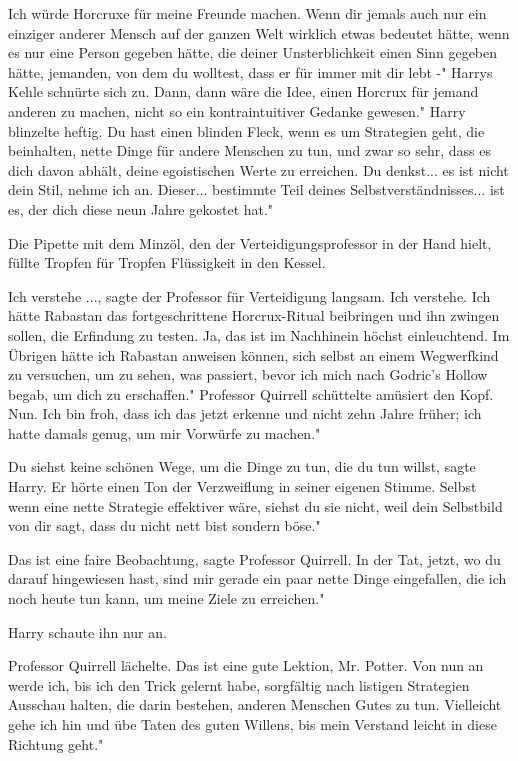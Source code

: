 \glqq Ich würde Horcruxe für meine Freunde machen. Wenn dir jemals auch nur ein
einziger anderer Mensch auf der ganzen Welt wirklich etwas bedeutet hätte, wenn
es nur eine Person gegeben hätte, die deiner Unsterblichkeit einen Sinn gegeben
hätte, jemanden, von dem du wolltest, dass er für immer mit dir lebt -" Harrys
Kehle schnürte sich zu. \glqq Dann, dann wäre die Idee, einen Horcrux für jemand
anderen zu machen, nicht so ein kontraintuitiver Gedanke gewesen." Harry
blinzelte heftig. \glqq Du hast einen blinden Fleck, wenn es um Strategien geht,
die beinhalten, nette Dinge für andere Menschen zu tun, und zwar so sehr, dass
es dich davon abhält, deine egoistischen Werte zu erreichen. Du denkst... es ist
nicht dein Stil, nehme ich an. Dieser... bestimmte Teil deines
Selbstverständnisses... ist es, der dich diese neun Jahre gekostet hat."

Die Pipette mit dem Minzöl, den der Verteidigungsprofessor in der Hand hielt,
füllte Tropfen für Tropfen Flüssigkeit in den Kessel.

\glqq Ich verstehe ...\grqq{}, sagte der Professor für Verteidigung langsam.
\glqq Ich verstehe. Ich hätte Rabastan das fortgeschrittene Horcrux-Ritual
beibringen und ihn zwingen sollen, die Erfindung zu testen. Ja, das ist im
Nachhinein höchst einleuchtend. Im Übrigen hätte ich Rabastan anweisen können,
sich selbst an einem Wegwerfkind zu versuchen, um zu sehen, was passiert, bevor
ich mich nach Godric's Hollow begab, um dich zu erschaffen." Professor Quirrell
schüttelte amüsiert den Kopf. \glqq Nun. Ich bin froh, dass ich das jetzt
erkenne und nicht zehn Jahre früher; ich hatte damals genug, um mir Vorwürfe zu
machen."

\glqq Du siehst keine schönen Wege, um die Dinge zu tun, die du tun
willst\grqq{}, sagte Harry. Er hörte einen Ton der Verzweiflung in seiner
eigenen Stimme. \glqq Selbst wenn eine nette Strategie effektiver wäre, siehst
du sie nicht, weil dein Selbstbild von dir sagt, dass du nicht nett bist sondern
böse."

\glqq Das ist eine faire Beobachtung\grqq{}, sagte Professor Quirrell. \glqq In
der Tat, jetzt, wo du darauf hingewiesen hast, sind mir gerade ein paar nette
Dinge eingefallen, die ich noch heute tun kann, um meine Ziele zu erreichen."

Harry schaute ihn nur an.

Professor Quirrell lächelte. \glqq Das ist eine gute Lektion, Mr. Potter. Von
nun an werde ich, bis ich den Trick gelernt habe, sorgfältig nach listigen
Strategien Ausschau halten, die darin bestehen, anderen Menschen Gutes zu tun.
Vielleicht gehe ich hin und übe Taten des guten Willens, bis mein Verstand
leicht in diese Richtung geht."

